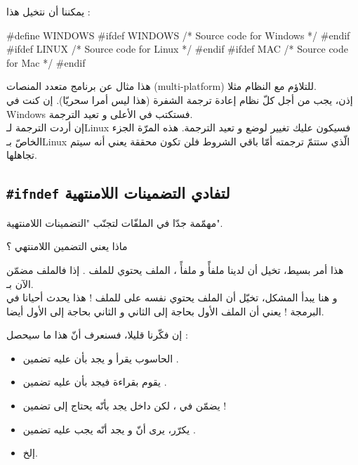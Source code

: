 يمكننا أن نتخيل هذا :
\begin{Csource}
#define WINDOWS
#ifdef WINDOWS
  /* Source code for Windows */
#endif
#ifdef LINUX
  /* Source code for Linux */
#endif
#ifdef MAC
  /* Source code for Mac */
#endif
\end{Csource}
هذا مثال عن برنامج متعدد المنصات
(\textenglish{multi-platform})
للتلاؤم مع النظام مثلا.\\
إذن، يجب من أجل كلّ نظام إعادة ترجمة الشفرة (هذا ليس أمرا سحريّا).
إن كنت في
\textenglish{Windows}
فستكتب
في الأعلى و تعيد الترجمة.\\
إن أردت الترجمة لـ\textenglish{Linux}
فسيكون عليك تغيير
لوضع
و تعيد الترجمة. هذه المرّة الجزء الخاصّ بـ\textenglish{Linux}
الّذي ستتمّ ترجمته أمّا باقي الشروط فلن تكون محققة يعني أنه سيتم تجاهلها.

\subsection{\texttt{\#ifndef} لتفادي التضمينات اللامنتهية}
مهمّمة جدّا في الملفّات
لتجنّب "التضمينات اللامنتهية".
\begin{question}
  ماذا يعني التضمين اللامنتهي ؟
\end{question}
هذا أمر بسيط، تخيل أن لدينا ملفأً
و ملفأً
،
الملف
يحتوي
للملف
.
إذا فالملف
مضمّن الآن بـ.\\
و هنا يبدأ المشكل، تخيّل أن الملف
يحتوي نفسه على
للملف
 !
هذا يحدث أحيانا في البرمجة ! يعني أن الملف الأول بحاجة إلى الثاني و الثاني بحاجة إلى الأول أيضا.

إن فكّرنا قليلا، فسنعرف أنّ هذا ما سيحصل :
\begin{itemize}
  \item  الحاسوب يقرأ
و يجد بأن عليه تضمين
.
  \item يقوم بقراءة
فيجد بأن عليه تضمين
.
  \item  يضمّن
في
،
لكن داخل
يجد بأنّه يحتاج إلى تضمين
 !
  \item يكرّر، يرى أنّ
و يجد أنّه يجب عليه تضمين
.
  \item إلخ.
\end{itemize}

